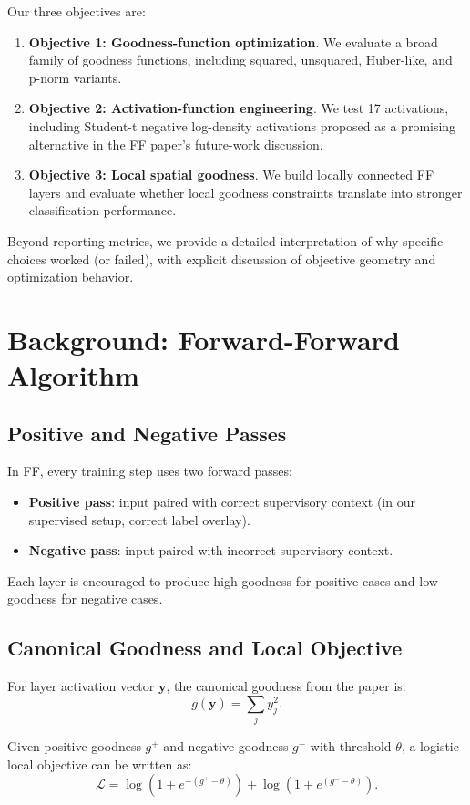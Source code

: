 \documentclass[sigconf]{acmart}
\begin{document}
Our three objectives are:
\begin{enumerate}
  \item \textbf{Objective 1: Goodness-function optimization}. We evaluate a broad family of goodness functions, including squared, unsquared, Huber-like, and p-norm variants.
  \item \textbf{Objective 2: Activation-function engineering}. We test 17 activations, including Student-t negative log-density activations proposed as a promising alternative in the FF paper's future-work discussion.
  \item \textbf{Objective 3: Local spatial goodness}. We build locally connected FF layers and evaluate whether local goodness constraints translate into stronger classification performance.
\end{enumerate}

Beyond reporting metrics, we provide a detailed interpretation of why specific choices worked (or failed), with explicit discussion of objective geometry and optimization behavior.

\section{Background: Forward-Forward Algorithm}
\subsection{Positive and Negative Passes}
In FF, every training step uses two forward passes:
\begin{itemize}
  \item \textbf{Positive pass}: input paired with correct supervisory context (in our supervised setup, correct label overlay).
  \item \textbf{Negative pass}: input paired with incorrect supervisory context.
\end{itemize}
Each layer is encouraged to produce high goodness for positive cases and low goodness for negative cases.

\subsection{Canonical Goodness and Local Objective}
For layer activation vector $\mathbf{y}$, the canonical goodness from the paper is:
\begin{equation}
  g(\mathbf{y}) = \sum_j y_j^2.
\end{equation}

Given positive goodness $g^+$ and negative goodness $g^-$ with threshold $\theta$, a logistic local objective can be written as:
\begin{equation}
\mathcal{L} = \log\left(1 + e^{-(g^+ - \theta)}\right) + \log\left(1 + e^{(g^- - \theta)}\right).
\end{equation}
\end{document}
